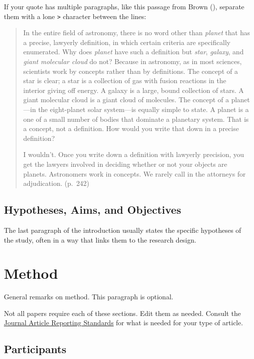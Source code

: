 \documentclass[
  jou,
  floatsintext,
  longtable,
  nolmodern,
  notxfonts,
  notimes,
  colorlinks=true,linkcolor=blue,citecolor=blue,urlcolor=blue]{apa7}
\begin{document}
If your quote has multiple paragraphs, like this passage from Brown
(), separate them with a
lone \texttt{\textgreater{}} character between the lines:

\begin{quote}
In the entire field of astronomy, there is no word other than
\emph{planet} that has a precise, lawyerly definition, in which certain
criteria are specifically enumerated. Why does \emph{planet} have such a
definition but \emph{star}, \emph{galaxy}, and \emph{giant molecular
cloud} do not? Because in astronomy, as in most sciences, scientists
work by concepts rather than by definitions. The concept of a star is
clear; a star is a collection of gas with fusion reactions in the
interior giving off energy. A galaxy is a large, bound collection of
stars. A giant molecular cloud is a giant cloud of molecules. The
concept of a planet---in the eight-planet solar system---is equally
simple to state. A planet is a one of a small number of bodies that
dominate a planetary system. That is a concept, not a definition. How
would you write that down in a precise definition?

I wouldn't. Once you write down a definition with lawyerly precision,
you get the lawyers involved in deciding whether or not your objects are
planets. Astronomers work in concepts. We rarely call in the attorneys
for adjudication. (p.~242)
\end{quote}

\subsection{Hypotheses, Aims, and
Objectives}\label{hypotheses-aims-and-objectives}

The last paragraph of the introduction usually states the specific
hypotheses of the study, often in a way that links them to the research
design.

\section{Method}\label{method}

General remarks on method. This paragraph is optional.

Not all papers require each of these sections. Edit them as needed.
Consult the \href{https://apastyle.apa.org/jars}{Journal Article
Reporting Standards} for what is needed for your type of article.

\subsection{Participants}\label{participants}
\end{document}
